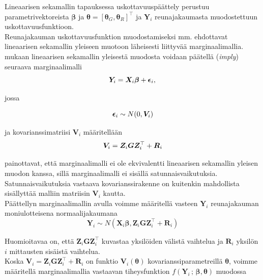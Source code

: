 \documentclass[finnish]{docopts}
\begin{document}
Lineaarisen sekamallin tapauksessa uskottavuuspäättely perustuu parametrivektoreista $\bm{\beta}$ ja $\bm{\theta} = [\bm{\theta}_G, \bm{\theta}_R]^\top$ ja $\bm{Y}_i$ reunajakaumasta muodostettuun uskottavuusfunktioon. \\

Reunajakauman uskottavuusfunktion muodostamiseksi mm. \cite{west14} ehdottavat lineaarisen sekamallin yleiseen muotoon läheisesti liittyvää marginaalimallia. \cite{west14} mukaan lineaarisen sekamallin yleisestä muodosta voidaan päätellä (\textit{imply}) seuraava marginaalimalli \\

\begin{equation}
\bm{Y}_i = \bm{X}_i \bm{\beta} + \bm{\epsilon}_i, \\
\label{eq:marginaalimalli}
\end{equation}

jossa

$$
\bm{\epsilon}_i \sim N(0,\bm{V}_i) \\
$$

ja kovarianssimatriisi $\bm{V}_i$ määritellään\\

$$
\bm{V}_i = \bm{Z}_i \bm{G} \bm{Z}^\top_i + \bm{R}_i \\
$$

\cite{west14} painottavat, että marginaalimalli ei ole ekvivalentti lineaarisen sekamallin yleisen muodon kanssa, sillä marginaalimalli ei sisällä satunnaisvaikutuksia. Satunnaisvaikutuksia vastaava kovarianssirakenne on kuitenkin mahdollista sisällyttää malliin matriisin $\bm{V}_i$ kautta.\\

Päättellyn marginaalimallin avulla voimme määritellä vasteen $\bm{Y}_i$ reunajakauman moniulotteisena normaalijakaumana \\

$$
\bm{Y}_i \sim N(\bm{X}_i \bm{\beta}, \bm{Z}_i \bm{G} \bm{Z}^\top_i + \bm{R}_i)
$$

Huomioitavaa on, että $\bm{Z}_i \bm{G} \bm{Z}^\top_i$ kuvastaa yksilöiden välistä vaihtelua ja $\bm{R}_i$ yksilön $i$ mittausten sisäistä vaihtelua. \\

Koska $\bm{V}_i = \bm{Z}_i \bm{G} \bm{Z}^\top_i + \bm{R}_i$ on funktio $\bm{V}_i(\bm{\theta})$ kovarianssiparametreillä $\bm{\theta}$, voimme määritellä marginaalimallia vastaavan tiheysfunktion $f(\bm{Y}_i \, ; \, \bm{\beta}, \bm{\theta})$ muodossa 
\end{document}
